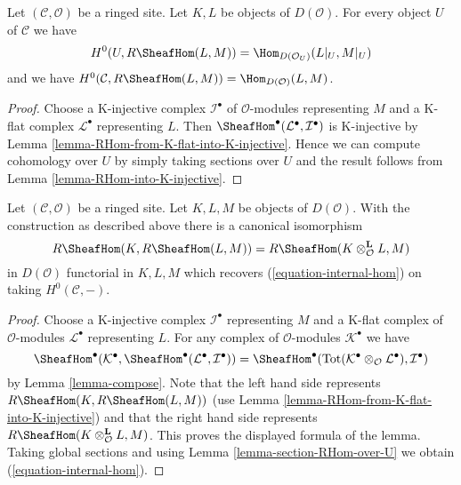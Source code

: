\begin{lemma}
\label{lemma-section-RHom-over-U}
Let $(\mathcal{C}, \mathcal{O})$ be a ringed site. Let $K, L$ be objects
of $D(\mathcal{O})$. For every object $U$ of $\mathcal{C}$ we have
$$
H^0(U, R\SheafHom(L, M)) =
\Hom_{D(\mathcal{O}_U)}(L|_U, M|_U)
$$
and we have $H^0(\mathcal{C}, R\SheafHom(L, M)) =
\Hom_{D(\mathcal{O})}(L, M)$.
\end{lemma}

\begin{proof}
Choose a K-injective complex $\mathcal{I}^\bullet$ of
$\mathcal{O}$-modules representing $M$ and a K-flat complex
$\mathcal{L}^\bullet$ representing $L$. Then
$\SheafHom^\bullet(\mathcal{L}^\bullet, \mathcal{I}^\bullet)$
is K-injective by Lemma \ref{lemma-RHom-from-K-flat-into-K-injective}.
Hence we can compute cohomology over $U$ by simply taking sections over $U$
and the result follows from Lemma \ref{lemma-RHom-into-K-injective}.
\end{proof}

\begin{lemma}
\label{lemma-internal-hom}
Let $(\mathcal{C}, \mathcal{O})$ be a ringed site. Let $K, L, M$ be objects
of $D(\mathcal{O})$. With the construction as described above
there is a canonical isomorphism
$$
R\SheafHom(K, R\SheafHom(L, M)) =
R\SheafHom(K \otimes_\mathcal{O}^\mathbf{L} L, M)
$$
in $D(\mathcal{O})$ functorial in $K, L, M$
which recovers (\ref{equation-internal-hom}) on taking $H^0(\mathcal{C}, -)$.
\end{lemma}

\begin{proof}
Choose a K-injective complex $\mathcal{I}^\bullet$ representing
$M$ and a K-flat complex of $\mathcal{O}$-modules $\mathcal{L}^\bullet$
representing $L$.
For any complex of $\mathcal{O}$-modules $\mathcal{K}^\bullet$
we have
$$
\SheafHom^\bullet(\mathcal{K}^\bullet,
\SheafHom^\bullet(\mathcal{L}^\bullet, \mathcal{I}^\bullet))
=
\SheafHom^\bullet(
\text{Tot}(\mathcal{K}^\bullet \otimes_\mathcal{O} \mathcal{L}^\bullet),
\mathcal{I}^\bullet)
$$
by Lemma \ref{lemma-compose}.
Note that the left hand side represents
$R\SheafHom(K, R\SheafHom(L, M))$ (use
Lemma \ref{lemma-RHom-from-K-flat-into-K-injective})
and that the right hand side represents
$R\SheafHom(K \otimes_\mathcal{O}^\mathbf{L} L, M)$.
This proves the displayed formula of the lemma.
Taking global sections and using Lemma \ref{lemma-section-RHom-over-U}
we obtain (\ref{equation-internal-hom}).
\end{proof}

